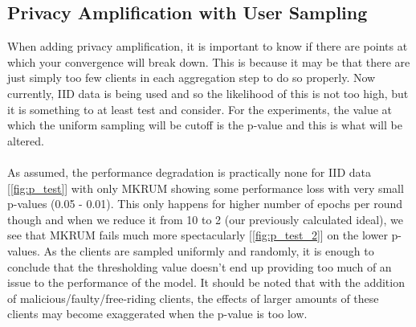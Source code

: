 \subsection{Privacy Amplification with User Sampling}
When adding privacy amplification, it is important to know if there are points at which your convergence will break down.
This is because it may be that there are just simply too few clients in each aggregation step to do so properly.
Now currently, IID data is being used and so the likelihood of this is not too high, but it is something to at least test and consider.
For the experiments, the value at which the uniform sampling will be cutoff is the p-value and this is what will be altered.
\\ \\
As assumed, the performance degradation is practically none for IID data [\ref{fig:p_test}] with only MKRUM showing some performance loss with very small p-values (0.05 - 0.01).
This only happens for higher number of epochs per round though and when we reduce it from 10 to 2 (our previously calculated ideal), we see that MKRUM fails much more spectacularly [\ref{fig:p_test_2}] on the lower p-values.
As the clients are sampled uniformly and randomly, it is enough to conclude that the thresholding value doesn't end up providing too much of an issue to the performance of the model.
It should be noted that with the addition of malicious/faulty/free-riding clients, the effects of larger amounts of these clients may become exaggerated when the p-value is too low.



